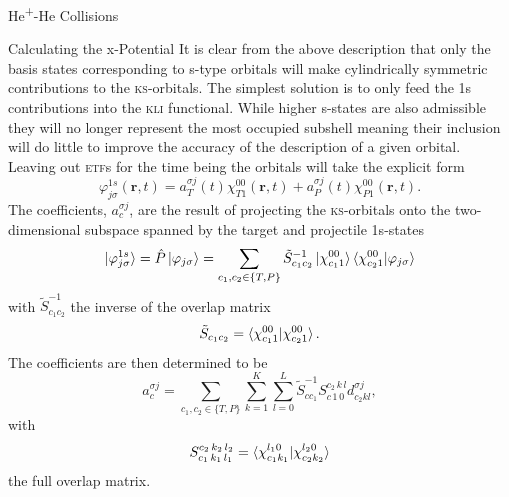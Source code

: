 \documentclass[letterpaper, 11 pt]{report}
\begin{document}
\begin{chapter}{\texorpdfstring{He\textsuperscript{+}}{He+}-He Collisions \label{chap:hephe}}
\begin{section}{Calculating the x-Potential \label{sec:pot}}
      It is clear from the above description that only the basis states corresponding to s-type orbitals
      will make cylindrically symmetric contributions to the \textsc{ks}-orbitals. The simplest solution
      is to only feed the 1s contributions into the \textsc{kli} functional. While higher s-states are
      also admissible they will no longer represent the most occupied subshell meaning their inclusion
      will do little to improve the accuracy of the description of a given orbital. Leaving out
      \textsc{etf}s for the time being the orbitals will take the explicit form
      \begin{equation} \label{eq:1sonly}
         \varphi_{j \sigma}^{1s}(\mathbf{r},t) = a^{\sigma j}_T(t) \chi^{00}_{T1}(\mathbf{r},t)
                                               + a^{\sigma j}_P(t) \chi^{00}_{P1}(\mathbf{r},t).
      \end{equation}
      The coefficients, $a^{\sigma j}_c$, are the result of projecting the \textsc{ks}-orbitals onto the
      two-dimensional subspace spanned by the target and projectile 1s-states
      \begin{equation} \label{eq:proj}
         \ket{\varphi^{1s}_{j \sigma}} = \hat{P} \ket{\varphi_{j \sigma}}
                                       = \sum\limits_{c_1, c_2 \in \{T,P\}} \tilde{S}^{-1}_{c_1 c_2}
                                                      \ket{\chi^{00}_{c_1 1}}
                                                      \braket{\chi^{00}_{c_2 1}| \varphi_{j \sigma}}
      \end{equation}
      with $\tilde{S}^{-1}_{c_1 c_2}$ the inverse of the overlap matrix
      \begin{equation} \label{eq:overlap2d}
         \tilde{S}_{c_1 c_2} = \braket{ \chi^{00}_{c_1 1} | \chi^{00}_{c_2 1} }.
      \end{equation}
      The coefficients are then determined to be
      \begin{equation} \label{eq:coef}
         a^{\sigma j}_c = \sum\limits_{c_1, c_2 \in \{T,P\}} \sum\limits_{k = 1}^K
                          \sum\limits_{l = 0}^L \tilde{S}^{-1}_{c c_1} S^{c_2 \, k \, l}_{c \, 1 \, 0}
                             d^{\sigma j}_{c_2 k l},
      \end{equation}
      with
      \begin{equation} \label{eq:overlap}
         S_{c_1 \, k_1 \, l_1 }^{c_2 \, k_2 \, l_2 } =
            \braket{ \chi^{l_1 0}_{c_1 k_1} | \chi^{l_2 0}_{c_2 k_2} }
      \end{equation}
      the full overlap matrix.


\end{section}
\end{chapter}
\end{document}
